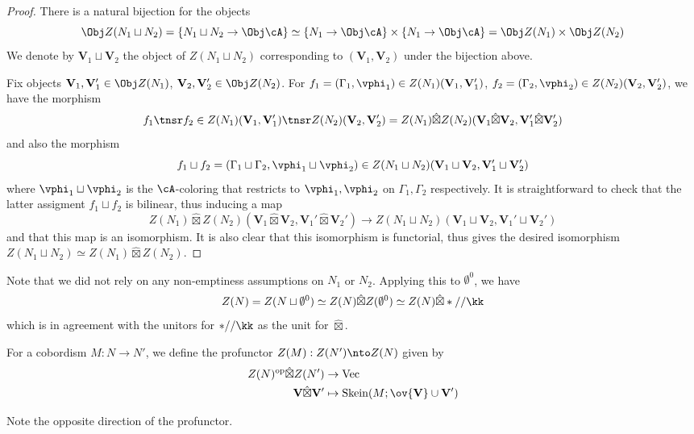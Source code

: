 \documentclass[12pt]{article}
\newcommand{\empt}[1]{{\emptyset^{#1}}}
\newcommand{\VV}{{\mathbf{V}}}
\DeclareMathOperator{\Skein}{Skein}
\newcommand{\op}{{\text{op}}}
\newcommand{\hatbox}{{\hat{\boxtimes}}}
\DeclareMathOperator{\Vect}{Vec}
\begin{document}
\begin{proof}
There is a natural bijection for the objects
\[
\Obj Z(N_1 \sqcup N_2) = \{N_1 \sqcup N_2 \to \Obj \cA\}
\simeq \{N_1 \to \Obj \cA\} \times \{N_1 \to \Obj \cA\}
= \Obj Z(N_1) \times \Obj Z(N_2)
\]
We denote by $\VV_1 \sqcup \VV_2$ the object of $Z(N_1 \sqcup N_2)$
corresponding to $(\VV_1,\VV_2)$ under the bijection above.

Fix objects $\VV_1,\VV_1' \in \Obj Z(N_1)$,
$\VV_2,\VV_2' \in \Obj Z(N_2)$.
For $f_1 = (\Gamma_1,\vphi_1) \in Z(N_1)(\VV_1,\VV_1')$,
$f_2 = (\Gamma_2,\vphi_2) \in Z(N_2)(\VV_2,\VV_2')$,
we have the morphism
\[
f_1 \tnsr f_2 \in
Z(N_1)(\VV_1,\VV_1') \tnsr Z(N_2)(\VV_2,\VV_2')
= Z(N_1) \hatbox Z(N_2)(\VV_1 \hatbox \VV_2, \VV_1' \hatbox \VV_2')
\]
and also the morphism
\[
f_1 \sqcup f_2 = (\Gamma_1 \sqcup \Gamma_2, \vphi_1 \sqcup \vphi_2)
\in Z(N_1 \sqcup N_2) (\VV_1 \sqcup \VV_2, \VV_1' \sqcup \VV_2')
\]
where $\vphi_1 \sqcup \vphi_2$ is the $\cA$-coloring that
restricts to $\vphi_1,\vphi_2$ on $\Gamma_1,\Gamma_2$ respectively.
It is straightforward to check that
the latter assigment $f_1 \sqcup f_2$ is bilinear,
thus inducing a map
\[
Z(N_1) \hatbox Z(N_2)(\VV_1 \hatbox \VV_2, \VV_1' \hatbox \VV_2')
\to Z(N_1 \sqcup N_2) (\VV_1 \sqcup \VV_2, \VV_1' \sqcup \VV_2')
\]
and that this map is an isomorphism.
It is also clear that this isomorphism is functorial,
thus gives the desired isomorphism
$Z(N_1 \sqcup N_2) \simeq Z(N_1) \hatbox Z(N_2)$.
\end{proof}

Note that we did not rely on any non-emptiness assumptions
on $N_1$ or $N_2$.
Applying this to $\empt{0}$,
we have
\[
Z(N) = Z(N \sqcup \empt{0}) \simeq Z(N) \hatbox Z(\empt{0})
\simeq Z(N) \hatbox *//\kk
\]
which is in agreement with the unitors for
$*//\kk$ as the unit for $\hatbox$.


\begin{remark}
\label{r:1-bord-direction}
\end{remark}


\begin{definition}
For a cobordism $M : N \to N'$,
we define the profunctor $Z(M): Z(N') \nto Z(N)$
given by
\begin{align*}
Z(N)^\op \hatbox Z(N') &\to \Vect
\\
\VV \hatbox \VV' &\mapsto \Skein(M; \ov{\VV} \cup \VV')
\end{align*}
\end{definition}

Note the opposite direction of the profunctor.
\end{document}
